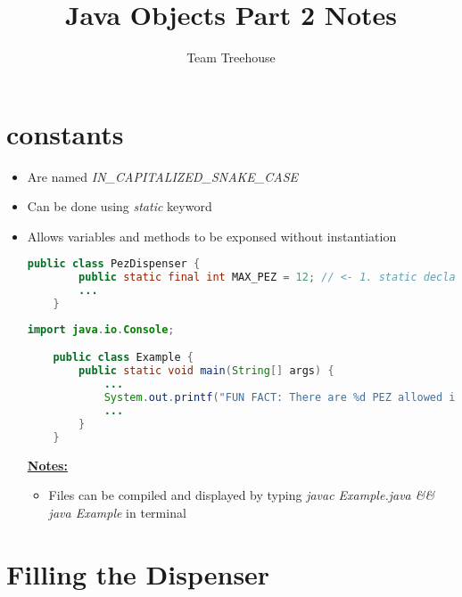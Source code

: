 \documentclass[12pt]{article}
\begin{document}
\title{Java Objects Part 2 Notes}
\author{Team Treehouse}
\maketitle

\bigskip

\section{constants}

\bigskip

\begin{itemize}
    \item Are named \textit{IN\_CAPITALIZED\_SNAKE\_CASE}
    \item Can be done using \textit{static} keyword
    \item Allows variables and methods to be exponsed without instantiation

    \begin{lstlisting}[language=Java,caption={lesson\_1/PezDispenser.java}]
    public class PezDispenser {
        public static final int MAX_PEZ = 12; // <- 1. static declared here :)
        ...
    }
    \end{lstlisting}

    \begin{lstlisting}[language=Java,caption={lesson\_1/Example.java}]
    import java.io.Console;

    public class Example {
        public static void main(String[] args) {
            ...
            System.out.printf("FUN FACT: There are %d PEZ allowed in every dispenser\n", PezDispenser.MAX_PEZ); // 2. <- And is used here :)
            ...
        }
    }
    \end{lstlisting}

    \bigskip

    \underline{\textbf{Notes:}}

    \bigskip

    \begin{itemize}
        \item Files can be compiled and displayed by typing \textit{javac Example.java \&\& java Example}
        in terminal
    \end{itemize}
\end{itemize}

\bigskip

\section{Filling the Dispenser}
\end{document}
